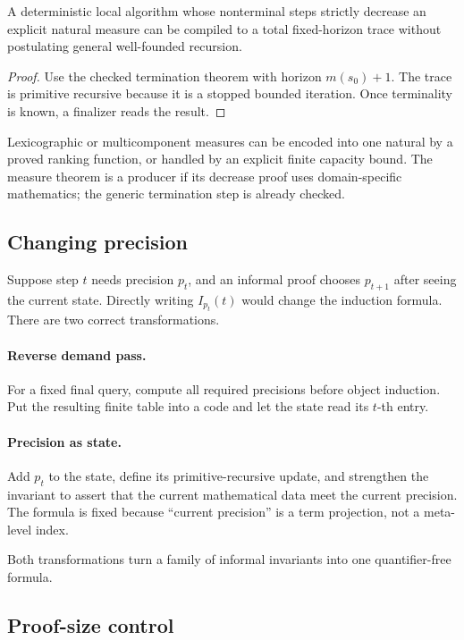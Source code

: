 \begin{corollary}
A deterministic local algorithm whose nonterminal steps strictly decrease an explicit natural
measure can be compiled to a total fixed-horizon trace without postulating general well-founded
recursion.
\end{corollary}

\begin{proof}
Use the checked termination theorem with horizon \(m(s_0)+1\).  The trace is primitive recursive
because it is a stopped bounded iteration.  Once terminality is known, a finalizer reads the result.
\end{proof}

Lexicographic or multicomponent measures can be encoded into one natural by a proved ranking
function, or handled by an explicit finite capacity bound.  The measure theorem is a producer if its
decrease proof uses domain-specific mathematics; the generic termination step is already checked.

\subsection{Changing precision}

Suppose step \(t\) needs precision \(p_t\), and an informal proof chooses \(p_{t+1}\) after seeing the
current state.  Directly writing \(I_{p_t}(t)\) would change the induction formula.  There are two
correct transformations.

\paragraph{Reverse demand pass.}
For a fixed final query, compute all required precisions before object induction.  Put the resulting
finite table into a code and let the state read its \(t\)-th entry.

\paragraph{Precision as state.}
Add \(p_t\) to the state, define its primitive-recursive update, and strengthen the invariant to
assert that the current mathematical data meet the current precision.  The formula is fixed because
``current precision'' is a term projection, not a meta-level index.

Both transformations turn a family of informal invariants into one quantifier-free formula.

\subsection{Proof-size control}

